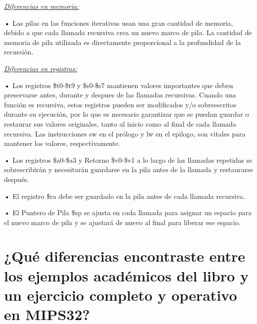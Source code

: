 \documentclass{article}
\begin{document}
\textit{\underline{Diferencias en memoria: }}

\quad

\textbf{•   } { Las pilas en las funciones iterativas usan una gran cantidad de memoria, debido a que cada llamada recursiva crea un nuevo marco de pila. La cantidad de memoria de pila utilizada es directamente proporcional a la profundidad de la recursión.}

\quad

\textit{\underline{Diferencias en registros: }}



\quad

\textbf{•   } { Los registros \$t0-\$t9 y \$s0-\$s7 mantienen valores importantes que deben preservarse antes, durante y despues de las llamadas recursivas. Cuando una función es recursiva, estos registros pueden ser modificados y/o sobreescritos durante su ejecución, por lo que es necesario garantizar que se puedan guardar o restaurar sus valores originales, tanto al inicio como al final de cada llamada recursiva. Las instrucciones sw en el prólogo y lw en el epilogo, son vitales para mantener los valores, respectivamente.}

\quad

\textbf{•   } { Los registros \$a0-\$a3 y Retorno \$v0-\$v1 a lo largo de las llamadas repetidas se sobrescribirán y necesitarán guardarse en la pila antes de la llamada y restaurarse después.}

\quad

\textbf{•   } { El registro \$ra debe ser guardado en la pila antes de cada llamada recursiva.}

\quad

\textbf{•   } { El Puntero de Pila \$sp se ajusta en cada llamada para asignar un espacio para el nuevo marco de pila y se ajustará de nuevo al final para liberar ese espacio.}

\quad
\newpage

\section{¿Qué diferencias encontraste entre los ejemplos académicos del libro y un ejercicio completo y operativo en MIPS32?}

\quad
\end{document}
